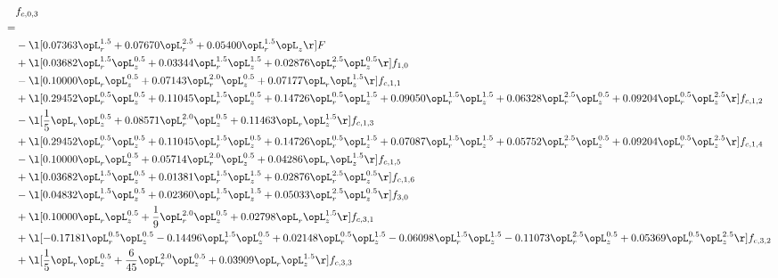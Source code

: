 \begin{alignat}{2} 
\label{eq:f_03_2} 
& f_{c,0,3} \nonumber \\ 
 = \\ 
& - \l[  0.07363 \opL_r^{1.5} +  0.07670 \opL_r^{2.5} +  0.05400 \opL_r^{1.5} \opL_z  \r] F \nonumber \\ 
& + \l[  0.03682 \opL_r^{1.5} \opL_z^{0.5} +  0.03344 \opL_r^{1.5} \opL_z^{1.5} +  0.02876 \opL_r^{2.5} \opL_z^{0.5}  \r] f_{1,0} \nonumber \\ 
& - \l[  0.10000 \opL_r \opL_z^{0.5} +  0.07143 \opL_r^{2.0} \opL_z^{0.5} +  0.07177 \opL_r \opL_z^{1.5}  \r] f_{c,1,1} \nonumber \\ 
& + \l[  0.29452 \opL_r^{0.5} \opL_z^{0.5} +  0.11045 \opL_r^{1.5} \opL_z^{0.5} +  0.14726 \opL_r^{0.5} \opL_z^{1.5} +  0.09050 \opL_r^{1.5} \opL_z^{1.5} +  0.06328 \opL_r^{2.5} \opL_z^{0.5} +  0.09204 \opL_r^{0.5} \opL_z^{2.5}  \r] f_{c,1,2} \nonumber \\ 
& - \l[ \frac{1}{5} \opL_r \opL_z^{0.5} +  0.08571 \opL_r^{2.0} \opL_z^{0.5} +  0.11463 \opL_r \opL_z^{1.5}  \r] f_{c,1,3} \nonumber \\ 
& + \l[  0.29452 \opL_r^{0.5} \opL_z^{0.5} +  0.11045 \opL_r^{1.5} \opL_z^{0.5} +  0.14726 \opL_r^{0.5} \opL_z^{1.5} +  0.07087 \opL_r^{1.5} \opL_z^{1.5} +  0.05752 \opL_r^{2.5} \opL_z^{0.5} +  0.09204 \opL_r^{0.5} \opL_z^{2.5}  \r] f_{c,1,4} \nonumber \\ 
& - \l[  0.10000 \opL_r \opL_z^{0.5} +  0.05714 \opL_r^{2.0} \opL_z^{0.5} +  0.04286 \opL_r \opL_z^{1.5}  \r] f_{c,1,5} \nonumber \\ 
& + \l[  0.03682 \opL_r^{1.5} \opL_z^{0.5} +  0.01381 \opL_r^{1.5} \opL_z^{1.5} +  0.02876 \opL_r^{2.5} \opL_z^{0.5}  \r] f_{c,1,6} \nonumber \\ 
& - \l[  0.04832 \opL_r^{1.5} \opL_z^{0.5} +  0.02360 \opL_r^{1.5} \opL_z^{1.5} +  0.05033 \opL_r^{2.5} \opL_z^{0.5}  \r] f_{3,0} \nonumber \\ 
& + \l[  0.10000 \opL_r \opL_z^{0.5} + \frac{1}{9} \opL_r^{2.0} \opL_z^{0.5} +  0.02798 \opL_r \opL_z^{1.5}  \r] f_{c,3,1} \nonumber \\ 
& + \l[  -0.17181 \opL_r^{0.5} \opL_z^{0.5}   -0.14496 \opL_r^{1.5} \opL_z^{0.5} +  0.02148 \opL_r^{0.5} \opL_z^{1.5}   -0.06098 \opL_r^{1.5} \opL_z^{1.5}   -0.11073 \opL_r^{2.5} \opL_z^{0.5} +  0.05369 \opL_r^{0.5} \opL_z^{2.5}  \r] f_{c,3,2} \nonumber \\ 
& + \l[ \frac{1}{5} \opL_r \opL_z^{0.5} + \frac{6}{45} \opL_r^{2.0} \opL_z^{0.5} +  0.03909 \opL_r \opL_z^{1.5}  \r] f_{c,3,3} \nonumber \\ 

\end{alignat}

